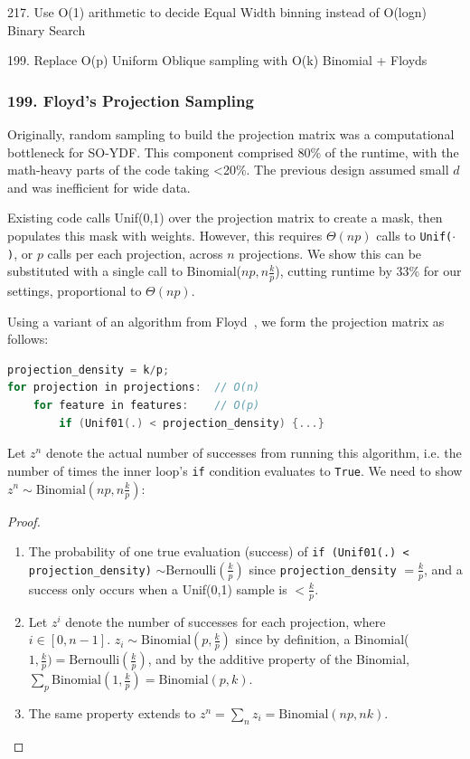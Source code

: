 \documentclass[sigconf]{acmart}
\begin{document}
217. Use O(1) arithmetic to decide Equal Width binning instead of O(logn) Binary Search 

199. Replace O(p) Uniform Oblique sampling with O(k) Binomial + Floyds 
 
\subsubsection{199. Floyd's Projection Sampling}
\label{app:floyds}

Originally, random sampling to build the projection matrix was a computational bottleneck for SO-YDF. This component comprised 80\% of the runtime, with the math-heavy parts of the code taking <20\%. The previous design assumed small $d$ and was inefficient for wide data.

Existing code calls Unif(0,1) over the projection matrix to create a mask, then populates this mask with weights. However, this requires $\Theta(np)$ calls to {\tt Unif($\cdot$)}, or $p$ calls per each projection, across $n$ projections. We show this can be substituted with a single call to Binomial($np, n\frac{k}{p}$), cutting runtime by 33\% for our settings, proportional to $\Theta(np)$.

Using a variant of an algorithm from Floyd~\cite{10.1145/30401.315746}, we form the projection matrix as follows:

\begin{lstlisting}[language=c++]
projection_density = k/p;
for projection in projections:  // O(n)
    for feature in features:    // O(p)
        if (Unif01(.) < projection_density) {...}
\end{lstlisting}

Let $z^n$ denote the actual number of successes from running this algorithm, i.e. the number of times the inner loop's \texttt{if} condition evaluates to \texttt{True}. We need to show $z^n \sim \text{Binomial}(np,n\frac{k}{p})$:

\begin{proof}

\begin{enumerate}
    \item The probability of one true evaluation (success) of \texttt{if (Unif01(.) < projection\_density)} $\sim \text{Bernoulli}(\frac{k}{p})$ since \texttt{projection\_density} $=\frac{k}{p}$, and a success only occurs when a Unif(0,1) sample is $< \frac{k}{p}$.
    \item Let $z^i$ denote the number of successes for each projection, where $i\in [0,n-1]$. $z_i \sim \text{Binomial}(p,\frac{k}{p})$ since by definition, a Binomial($1,\frac{k}{p})=\text{Bernoulli}(\frac{k}{p})$, and by the additive property of the Binomial, $\sum_p \text{Binomial}(1,\frac{k}{p})=\text{Binomial}(p,k)$.
    \item The same property extends to $z^n=\sum_n z_i=\text{Binomial}(np,nk)$.
\end{enumerate}

\end{proof}
\end{document}
